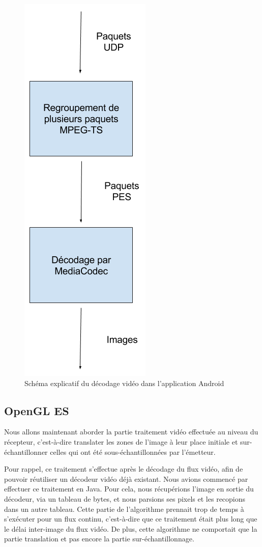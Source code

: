 \documentclass[11pt,a4paper]{article}
\begin{document}
\begin{figure}[H]
\begin{center}
\includegraphics[scale=0.35]{images/decodage_video.png}
\end{center}
\caption{Schéma explicatif du décodage vidéo dans l'application Android}
\label{}
\end{figure}

\subsection{OpenGL ES}
Nous allons maintenant aborder la partie traitement vidéo effectuée au niveau du récepteur, c'est-à-dire translater les zones de l'image à leur place initiale et sur-échantillonner celles qui ont été sous-échantillonnées par l'émetteur.

\bigbreak
Pour rappel, ce traitement s'effectue après le décodage du flux vidéo, afin de pouvoir réutiliser un décodeur vidéo déjà existant.
Nous avions commencé par effectuer ce traitement en Java. 
Pour cela, nous récupérions l'image en sortie du décodeur, via un tableau de bytes, et nous parsions ses pixels et les recopions dans un autre tableau.
Cette partie de l'algorithme prennait trop de temps à s'exécuter pour un flux continu, c'est-à-dire que ce traitement était plus long que le délai inter-image du flux vidéo.
De plus, cette algorithme ne comportait que la partie translation et pas encore la partie sur-échantillonnage.
\end{document}
